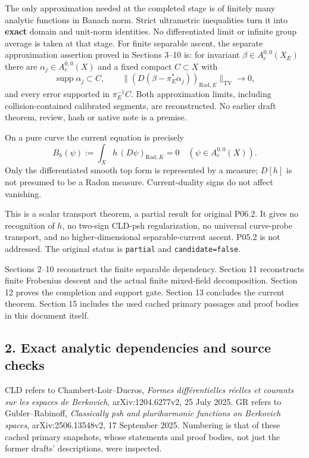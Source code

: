 \documentclass[
  11pt,
]{article}
\newcommand{\passthrough}[1]{#1}
\begin{document}
The only approximation needed at the completed stage is of finitely many
analytic functions in Banach norm. Strict ultrametric inequalities turn
it into \textbf{exact} domain and unit-norm identities. No
differentiated limit or infinite group average is taken at that stage.
For finite separable ascent, the separate approximation assertion proved
in Sections 3--10 is: for invariant \(\beta\in A_c^{0,0}(X_E)\) there
are \(\alpha_j\in A_c^{0,0}(X)\) and a fixed compact \(C\subset X\) with
\[
 \operatorname{supp}\alpha_j\subset C,\qquad
 \big\|(D(\beta-\pi_E^*\alpha_j))_{\mathrm{Rad},E}\big\|_{\mathrm{TV}}
                 \longrightarrow0,                  \tag{2}
\] and every error supported in \(\pi_E^{-1}C\). Both approximation
limits, including collision-contained calibrated segments, are
reconstructed. No earlier draft theorem, review, hash or native note is
a premise.

On a pure curve the current equation is precisely \[
 B_h(\psi):=\int_X h\,(D\psi)_{\mathrm{Rad},K}=0
                  \quad(\psi\in A_c^{0,0}(X)).         \tag{3}
\] Only the differentiated smooth top form is represented by a measure;
\(D[h]\) is not presumed to be a Radon measure. Current-duality signs do
not affect vanishing.

This is a scalar transport theorem, a partial result for original P06.2.
It gives no recognition of \(h\), no two-sign CLD-psh regularization, no
universal curve-probe transport, and no higher-dimensional
separable-current ascent. P05.2 is not addressed. The original status is
\passthrough{\lstinline!partial!} and
\passthrough{\lstinline!candidate=false!}.

Sections 2--10 reconstruct the finite separable dependency. Section 11
reconstructs finite Frobenius descent and the actual finite mixed-field
decomposition. Section 12 proves the completion and support gate.
Section 13 concludes the current theorem. Section 15 includes the used
cached primary passages and proof bodies in this document itself.

\subsection{2. Exact analytic dependencies and source
checks}\label{exact-analytic-dependencies-and-source-checks}

CLD refers to Chambert-Loir--Ducros, \emph{Formes différentielles
réelles et courants sur les espaces de Berkovich}, arXiv:1204.6277v2, 25
July 2025. GR refers to Gubler--Rabinoff, \emph{Classically psh and
pluriharmonic functions on Berkovich spaces}, arXiv:2506.13548v2, 17
September 2025. Numbering is that of these cached primary snapshots,
whose statements and proof bodies, not just the former drafts'
descriptions, were inspected.
\end{document}
